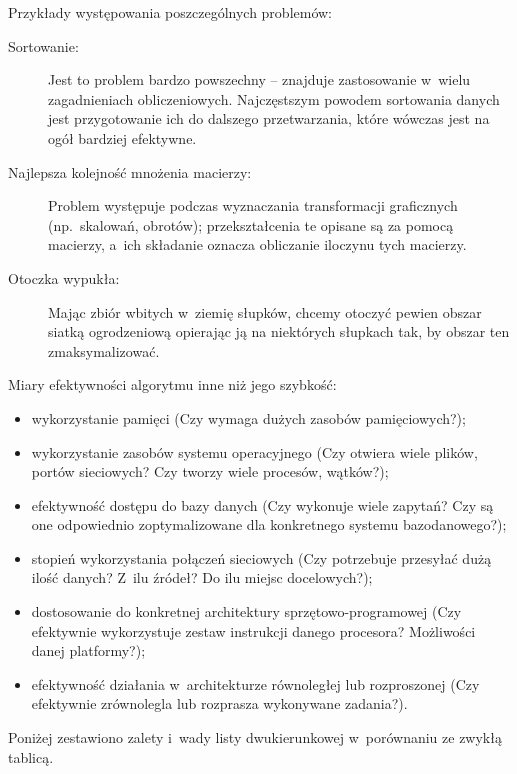 
\exercise %
Przykłady występowania poszczególnych problemów:
\begin{description}
	\item[Sortowanie:] Jest to problem bardzo powszechny -- znajduje zastosowanie w~wielu zagadnieniach obliczeniowych.
Najczęstszym powodem sortowania danych jest przygotowanie ich do dalszego przetwarzania, które wówczas jest na ogół bardziej efektywne.
	\item[Najlepsza kolejność mnożenia macierzy:] Problem występuje podczas wyznaczania transformacji graficznych (np.\ skalowań, obrotów); przekształcenia te opisane są za pomocą macierzy, a~ich składanie oznacza obliczanie iloczynu tych macierzy.
	\item[Otoczka wypukła:] Mając zbiór wbitych w~ziemię słupków, chcemy otoczyć pewien obszar siatką ogrodzeniową opierając ją na niektórych słupkach tak, by obszar ten zmaksymalizować.
\end{description}

\exercise %
Miary efektywności algorytmu inne niż jego szybkość:
\begin{itemize}
	\item wykorzystanie pamięci (Czy wymaga dużych zasobów pamięciowych?);
	\item wykorzystanie zasobów systemu operacyjnego (Czy otwiera wiele plików, portów sieciowych? Czy tworzy wiele procesów, wątków?);
	\item efektywność dostępu do bazy danych (Czy wykonuje wiele zapytań? Czy są one odpowiednio zoptymalizowane dla konkretnego systemu bazodanowego?);
	\item stopień wykorzystania połączeń sieciowych (Czy potrzebuje przesyłać dużą ilość danych? Z~ilu źródeł? Do ilu miejsc docelowych?);
	\item dostosowanie do konkretnej architektury sprzętowo-programowej (Czy efektywnie wykorzystuje zestaw instrukcji danego procesora? Możliwości danej platformy?);
	\item efektywność działania w~architekturze równoległej lub rozproszonej (Czy efektywnie zrównolegla lub rozprasza wykonywane zadania?).
\end{itemize}

\exercise %
Poniżej zestawiono zalety i~wady listy dwukierunkowej w~porównaniu ze zwykłą tablicą.

